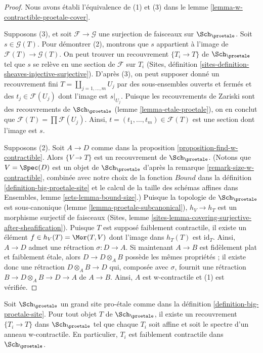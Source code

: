 \begin{proof}
Nous avons établi l'équivalence de (1) et (3) dans le
lemme \ref{lemma-w-contractible-proetale-cover}.

\medskip\noindent
Supposons (3), et soit $\mathcal{F} \to \mathcal{G}$ une surjection de faisceaux sur
$\Sch_\proetale$. Soit $s \in \mathcal{G}(T)$. Pour démontrer (2), montrons que
$s$ appartient à l'image de $\mathcal{F}(T) \to \mathcal{G}(T)$. On peut trouver un
recouvrement $\{T_i \to T\}$ de $\Sch_\proetale$ tel que $s$ se relève
en une section de $\mathcal{F}$ sur $T_i$
(Sites, définition \ref{sites-definition-sheaves-injective-surjective}).
D'après (3), on peut supposer donné un recouvrement fini
$T = \coprod_{j = 1, \ldots, m} U_j$ par des sous-ensembles ouverts et fermés
et des $t_j \in \mathcal{F}(U_j)$ dont l'image est $s|_{U_j}$.
Puisque les recouvrements de Zariski sont des recouvrements de $\Sch_\proetale$
(lemme \ref{lemma-etale-proetale}), on en conclut que
$\mathcal{F}(T) = \prod \mathcal{F}(U_j)$.
Ainsi, $t = (t_1, \ldots, t_m) \in \mathcal{F}(T)$
est une section dont l'image est $s$.

\medskip\noindent
Supposons (2). Soit $A \to D$ comme dans la
proposition \ref{proposition-find-w-contractible}.
Alors $\{V \to T\}$ est un recouvrement de $\Sch_\proetale$.
(Notons que $V = \Spec(D)$ est un objet de $\Sch_\proetale$
d'après la remarque \ref{remark-size-w-contractible},
combinée avec notre choix de la fonction
$Bound$ dans la définition \ref{definition-big-proetale-site}
et le calcul de la taille des schémas affines dans
Ensembles, lemme \ref{sets-lemma-bound-size}.)
Puisque la topologie de $\Sch_\proetale$ est sous-canonique
(lemme \ref{lemma-proetale-subcanonical}),
$h_V \to h_T$ est un morphisme surjectif de faisceaux
(Sites, lemme \ref{sites-lemma-covering-surjective-after-sheafification}).
Puisque $T$ est supposé faiblement contractile, il existe un élément
$f \in h_V(T) = \Mor(T, V)$ dont l'image dans $h_T(T)$ est $\text{id}_T$.
Ainsi, $A \to D$ admet une rétraction $\sigma : D \to A$.
Si maintenant $A \to B$ est fidèlement plat et faiblement \'etale, alors
$D \to D \otimes_A B$ possède les mêmes propriétés ; il existe donc
une rétraction $D \otimes_A B \to D$ qui, composée avec
$\sigma$, fournit une rétraction $B \to D \otimes_A B \to D \to A$
de $A \to B$. Ainsi, $A$ est w-contractile et (1) est vérifiée.
\end{proof}

\begin{lemma}
\label{lemma-get-many-weakly-contractible}
Soit $\Sch_\proetale$ un grand site pro-\'etale comme dans la
définition \ref{definition-big-proetale-site}.
Pour tout objet $T$ de $\Sch_\proetale$, il existe
un recouvrement $\{T_i \to T\}$ dans $\Sch_\proetale$
tel que chaque $T_i$ soit affine et soit le spectre d'un anneau
w-contractile. En particulier, $T_i$ est faiblement contractile dans $\Sch_\proetale$.
\end{lemma}

